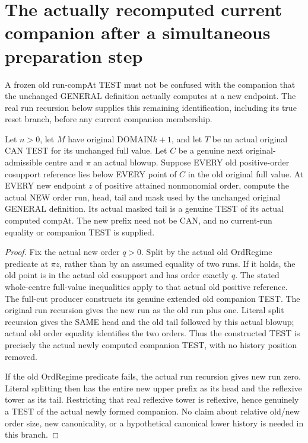 \section{The actually recomputed current companion after a simultaneous preparation step}

A frozen old run-compAt TEST must not be confused with the companion that
the unchanged GENERAL definition actually computes at a new endpoint.
The real run recursion below supplies this remaining identification,
including its true reset branch, before any current companion membership.

\begin{theorem}
\label{hir:original-full-cut-current-computed-companion-test}
\leanok
Let $n>0$, let $M$ have original DOMAIN$k+1$, and let $T$ be an actual
original CAN TEST for its unchanged full value. Let $C$ be a genuine next
original-admissible centre and $\pi$ an actual blowup. Suppose EVERY old
positive-order cosupport reference lies below EVERY point of $C$ in the
old original full value. At EVERY new endpoint $z$ of positive attained
nonmonomial order, compute the actual NEW order run, head, tail and mask
used by the unchanged original GENERAL definition. Its actual masked tail
is a genuine TEST of its actual computed compAt. The new prefix need not
be CAN, and no current-run equality or companion TEST is supplied.
\end{theorem}
\begin{proof}
Fix the actual new order $q>0$. Split by the actual old OrdRegime predicate
at $\pi z$, rather than by an assumed equality of two runs. If it holds,
the old point is in the actual old cosupport and has order exactly $q$.
The stated whole-centre full-value inequalities apply to that actual old
positive reference. The full-cut producer constructs its genuine extended
old companion TEST. The original run recursion gives the new run as the
old run plus one. Literal split recursion gives the SAME head and the old
tail followed by this actual blowup; actual old order equality identifies
the two orders. Thus the constructed TEST is precisely the actual newly
computed companion TEST, with no history position removed.

If the old OrdRegime predicate fails, the actual run recursion gives new
run zero. Literal splitting then has the entire new upper prefix as its
head and the reflexive tower as its tail. Restricting that real reflexive
tower is reflexive, hence genuinely a TEST of the actual newly formed
companion. No claim about relative old/new order size, new canonicality,
or a hypothetical canonical lower history is needed in this branch.
\end{proof}

